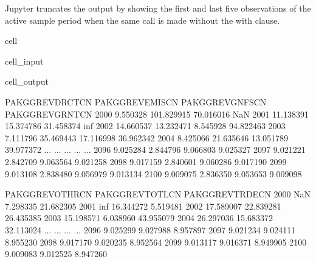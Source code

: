 \documentclass[letterpaper,10pt,english]{jupyterBook}
\begin{document}
\sphinxAtStartPar
Jupyter truncates the output by showing the first and last five observations of the active sample period when the same call is  made without the with clause.

\begin{sphinxuseclass}{cell}\begin{sphinxVerbatimInput}

\begin{sphinxuseclass}{cell_input}
\begin{sphinxVerbatim}[commandchars=\\\{\}]
\PYG{p}{[}\PYG{p}{]}
\end{sphinxVerbatim}

\end{sphinxuseclass}\end{sphinxVerbatimInput}
\begin{sphinxVerbatimOutput}

\begin{sphinxuseclass}{cell_output}
\begin{sphinxVerbatim}[commandchars=\\\{\}]
      PAKGGREVDRCTCN  PAKGGREVEMISCN  PAKGGREVGNFSCN  PAKGGREVGRNTCN   
2000        9.550328      101.829915       70.016016             NaN  \PYGZbs{}
2001       11.138391       15.374786       31.458374             inf   
2002       14.660537      \PYGZhy{}13.232471        8.545928       94.822463   
2003        7.111796       35.469443       17.116998      \PYGZhy{}36.962342   
2004        8.425066       21.635646       13.051789      \PYGZhy{}39.977372   
...              ...             ...             ...             ...   
2096        9.025284        2.844796        9.066803        9.025327   
2097        9.021221        2.842709        9.063564        9.021258   
2098        9.017159        2.840601        9.060286        9.017190   
2099        9.013108        2.838480        9.056979        9.013134   
2100        9.009075        2.836350        9.053653        9.009098   

      PAKGGREVOTHRCN  PAKGGREVTOTLCN  PAKGGREVTRDECN  
2000             NaN        7.298335      \PYGZhy{}21.682305  
2001             inf       16.344272        5.519481  
2002       17.589007       22.839281      \PYGZhy{}26.435385  
2003       15.198571        6.038960       43.955079  
2004       26.297036       15.683372       32.113024  
...              ...             ...             ...  
2096        9.025299        9.027988        8.957897  
2097        9.021234        9.024111        8.955230  
2098        9.017170        9.020235        8.952564  
2099        9.013117        9.016371        8.949905  
2100        9.009083        9.012525        8.947260  


\end{sphinxVerbatim}
\end{sphinxuseclass}
\end{sphinxVerbatimOutput}
\end{sphinxuseclass}
\end{document}
